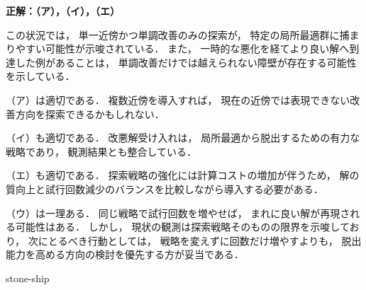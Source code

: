 \begin{example}[title={クイズ9 正解・解説}]
\label{ans:heu-multi3-var}
\textbf{正解：（ア），（イ），（エ）}

この状況では，
単一近傍かつ単調改善のみの探索が，
特定の局所最適群に捕まりやすい可能性が示唆されている．
また，
一時的な悪化を経てより良い解へ到達した例があることは，
単調改善だけでは越えられない障壁が存在する可能性を示している．

（ア）は適切である．
複数近傍を導入すれば，
現在の近傍では表現できない改善方向を探索できるかもしれない．

（イ）も適切である．
改悪解受け入れは，
局所最適から脱出するための有力な戦略であり，
観測結果とも整合している．

（エ）も適切である．
探索戦略の強化には計算コストの増加が伴うため，
解の質向上と試行回数減少のバランスを比較しながら導入する必要がある．

（ウ）は一理ある．
同じ戦略で試行回数を増やせば，
まれに良い解が再現される可能性はある．
しかし，
現状の観測は探索戦略そのものの限界を示唆しており，
次にとるべき行動としては，
戦略を変えずに回数だけ増やすよりも，
脱出能力を高める方向の検討を優先する方が妥当である．

\end{example}

 {stone-ship}
